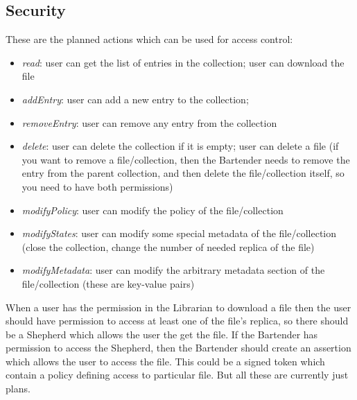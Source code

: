 \documentclass{book}
\begin{document}
\subsection{Security} %
\label{sub:security}

These are the planned actions which can be used for access control:
\begin{itemize}
    \item \emph{read}: user can get the list of entries in the collection; user can download the file
    \item \emph{addEntry}: user can add a new entry to the collection;
    \item \emph{removeEntry}: user can remove any entry from the collection 
    \item \emph{delete}: user can delete the collection if it is empty; user can delete a file (if you want to remove a file/collection, then the Bartender needs to remove the entry from the parent collection, and then delete the file/collection itself, so you need to have both permissions)
    \item \emph{modifyPolicy}: user can modify the policy of the file/collection
    \item \emph{modifyStates}: user can modify some special metadata of the file/collection (close the collection, change the number of needed replica of the file)
    \item \emph{modifyMetadata}: user can modify the arbitrary metadata section of the file/collection (these are key-value pairs)
\end{itemize}
When a user has the permission in the Librarian to download a file then the user should have permission to access at least one of the file's replica, so there should be a Shepherd which allows the user the get the file. If the Bartender has permission to access the Shepherd, then the Bartender should create an assertion which allows the user to access the file. This could be a signed token which contain a policy defining access to particular file. But all these are currently just plans.




% 
\end{document}
